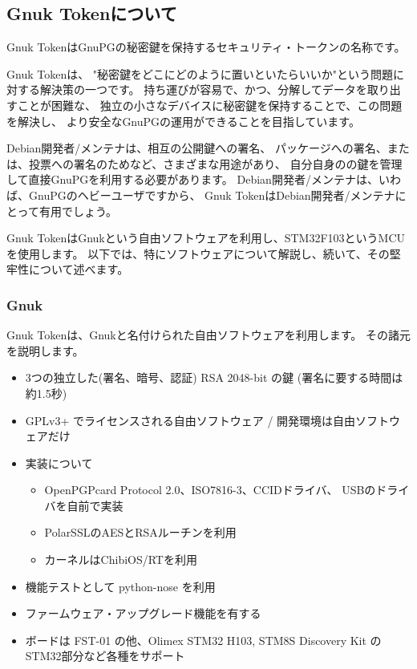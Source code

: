 \documentclass[mingoth,a4paper,twoside]{jsarticle}
\begin{document}
\subsection{Gnuk Tokenについて}
Gnuk TokenはGnuPGの秘密鍵を保持するセキュリティ・トークンの名称です。

Gnuk Tokenは、
"秘密鍵をどこにどのように置いといたらいいか"という問題に対する解決策の一つです。
持ち運びが容易で、かつ、分解してデータを取り出すことが困難な、
独立の小さなデバイスに秘密鍵を保持することで、この問題を解決し、
より安全なGnuPGの運用ができることを目指しています。

Debian開発者/メンテナは、相互の公開鍵への署名、
パッケージへの署名、または、投票への署名のためなど、さまざまな用途があり、
自分自身のの鍵を管理して直接GnuPGを利用する必要があります。
%
Debian開発者/メンテナは、いわば、GnuPGのヘビーユーザですから、
Gnuk TokenはDebian開発者/メンテナにとって有用でしょう。

Gnuk TokenはGnukという自由ソフトウェアを利用し、STM32F103というMCUを使用します。
%
以下では、特にソフトウェアについて解説し、続いて、その堅牢性について述べます。

\subsubsection{Gnuk}
Gnuk Tokenは、Gnukと名付けられた自由ソフトウェアを利用します。
その諸元を説明します。

\begin{itemize}
\item 3つの独立した(署名、暗号、認証) RSA 2048-bit の鍵 (署名に要する時間は約1.5秒)
\item GPLv3+ でライセンスされる自由ソフトウェア / 開発環境は自由ソフトウェアだけ
\item 実装について
  \begin{itemize}
  \item OpenPGPcard Protocol 2.0、ISO7816-3、CCIDドライバ、
        USBのドライバを自前で実装
  \item PolarSSLのAESとRSAルーチンを利用
  \item カーネルはChibiOS/RTを利用
  \end{itemize}
\item 機能テストとして python-nose を利用
\item ファームウェア・アップグレード機能を有する
\item ボードは FST-01 の他、Olimex STM32 H103,
      STM8S Discovery Kit のSTM32部分など各種をサポート
\end{itemize}
\end{document}
